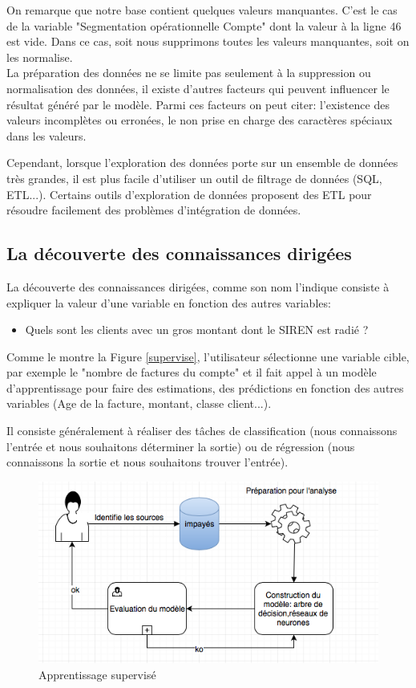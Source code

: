 \documentclass[11pt,a4paper]{report}
\begin{document}
On remarque que notre base contient quelques valeurs manquantes. C'est le cas de la variable "Segmentation opérationnelle Compte" dont la valeur à la ligne 46 est vide. Dans ce cas, soit nous supprimons toutes les valeurs manquantes, soit on les normalise.\\

La préparation des données ne se limite pas seulement à la suppression ou normalisation des données, il existe d'autres facteurs qui peuvent influencer le résultat généré par le modèle. Parmi ces facteurs on peut citer: l'existence des valeurs incomplètes ou erronées, le non prise en charge des caractères spéciaux dans les valeurs.

Cependant, lorsque l'exploration des données porte sur un ensemble de données très grandes, il est plus facile d'utiliser un outil de filtrage de données (SQL, ETL...).
Certains outils d'exploration de données proposent des ETL pour résoudre facilement des problèmes d'intégration de données.    


\subsection{La découverte des connaissances dirigées}

La découverte des connaissances dirigées, comme son nom l'indique consiste à expliquer la valeur d'une variable en fonction des autres variables:
\begin{itemize}
\item Quels sont les clients avec un gros montant dont le SIREN est radié ?
\end{itemize}
Comme le montre la Figure \ref{supervise}, l'utilisateur sélectionne une variable cible,  par exemple le "nombre de factures du compte" et il fait appel à un modèle d'apprentissage pour faire des estimations, des prédictions en fonction des autres variables (Age de la facture, montant, classe client...).  

Il consiste généralement à réaliser des tâches de classification (nous connaissons l'entrée et nous souhaitons déterminer la sortie) ou de régression (nous connaissons la sortie et nous souhaitons trouver l'entrée).  


\begin{figure}[h]
\centering
\includegraphics[scale=0.70]{dirigees.png}
\caption{Apprentissage supervisé}
\end{figure}
\label{supervise}
\newpage
\end{document}
